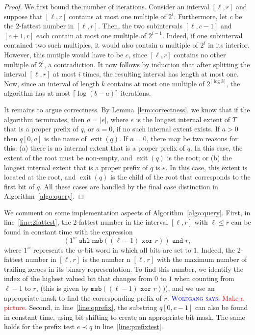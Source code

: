 \documentclass[a4paper,11pt]{article}
\newcommand{\eps}{\varepsilon}
\newcommand{\?}{\mskip1.5mu}
\DeclareMathOperator{\exit}{exit}
\newcommand{\aremark}[3]{\textcolor{blue}{\textsc{#1 #2:}}
  \textcolor{red}{\textsf{#3}}}
\newcommand{\wolfgang}[2][says]{\aremark{Wolfgang}{#1}{#2}}
\begin{document}
\begin{proof}
We first bound the number of iterations. Consider
an interval $[\ell, r]$ and suppose that
$[\ell, r]$ contains at most one multiple
of $2^i$. Furthermore, let $c$ be the 
$2$-fattest number in $[\ell, r]$.
Then, the two subintervals $[\ell, c - 1]$ and 
$[c + 1, r]$ each contain at most one multiple 
of $2^{i-1}$. Indeed, if one subinterval 
contained two such multiples, it would also 
contain a multiple of $2^i$ in its interior. 
However, this mutiple would have to be $c$, 
since $[\ell, r]$ contains no other multiple 
of $2^i$, a contradiction. It now follows 
by induction that after splitting the 
interval $[\ell, r]$ at most $i$ times, the 
resulting interval has length at most one. 
Now, since an interval of length $k$ contains at most one multiple of 
$2^{\lceil\log k\rceil}$, the algorithm
has at most $\lceil\log(b-a)\rceil$ iterations.

It remains to argue correctness. 
By Lemma~\ref{lem:correctness}, we know
that if the algorithm terminates, then
$a = |e|$, where $e$ is the longest internal
extent of $T$ that is a proper prefix of $q$,
or $a = 0$, if no such internal extent exists. If $a > 0$ 
then $q[0, a]$ is the name of $\exit(q)$.
If $a = 0$, there may be two 
reasons for this: (a) there is no internal
extent that is a proper prefix of $q$. In this case,
the extent of the root must be non-empty, and
$\exit(q)$ is the root; or (b) the longest internal
extent that is a proper prefix of $q$ is $\eps$.
In this case, this extent is located at the root, and 
$\exit(q)$ is the child of the root
that corresponds to the first bit
of $q$.
All these cases are handled by the
final case distinction in Algorithm~\ref{algo:query}.
\end{proof}

We comment on some implementation aspects of 
Algorithm~\ref{algo:query}.
First, in line~\ref{line:2fattest}, the 2-fattest
number in the interval $[\ell, r]$ with $\ell \leq r$
can be found in constant time with the expression 
\[
(1^w \texttt{ shl } 
\texttt{msb}((\ell - 1) \texttt{ xor } r)) \texttt{ and } r,
\]
where $1^w$ represents the $w$-bit word in which all bits
are set to $1$. Indeed, the 2-fattest number in $[\ell,r]$
is the number n $[\ell, r]$ with the maximum number of trailing zeroes
in its binary representation. To find this number, we identify
the index of the highest valued bit that changes from $0$ to
$1$ when counting from $\ell - 1$ to $r$, (this is
given by $\texttt{msb}((\ell - 1) \texttt{ xor } r))$), and 
we use an appropriate mask to find the corresponding
prefix of $r$. \wolfgang{Make a picture.}
Second, in line~\ref{line:qprefix}, the substring $q[0, c-1]$ 
can also be found in constant
time, using bit shifting to create an appropriate bit mask.
The same holds for the prefix test $e \prec q$ in line~\ref{line:prefixtest}.
\end{document}
